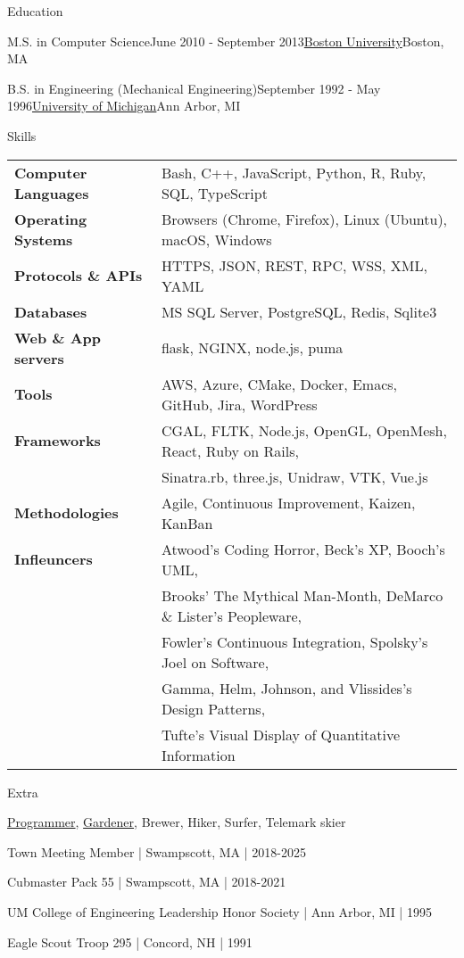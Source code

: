 \documentclass{resume}
\begin{document}
\begin{rSection}{Education}

  \begin{rSubsection}{M.S. in Computer Science}{June 2010 - September 2013}{\href{https://www.bu.edu/}{Boston University}}{Boston, MA}
  \item[]
  \end{rSubsection}

  \begin{rSubsection}{B.S. in Engineering (Mechanical Engineering)}{September 1992 - May 1996}{\href{https://www.umich.edu/}{University of Michigan}}{Ann Arbor, MI}
  \item[]
  \end{rSubsection}

\end{rSection}


\begin{rSection}{Skills}
\begin{tabular}{ @{} >{\bfseries}l @{\hspace{6ex}} l }
Computer Languages & Bash, C++, JavaScript, Python, R, Ruby, SQL, TypeScript \\
Operating Systems & Browsers (Chrome, Firefox), Linux (Ubuntu), macOS, Windows \\
Protocols \& APIs & HTTPS, JSON, REST, RPC, WSS, XML, YAML \\
Databases & MS SQL Server, PostgreSQL, Redis, Sqlite3 \\
Web \& App servers & flask, NGINX, node.js, puma \\
Tools & AWS, Azure, CMake, Docker, Emacs, GitHub, Jira, WordPress \\
Frameworks & CGAL, FLTK, Node.js, OpenGL, OpenMesh, React, Ruby on Rails, \\
 & Sinatra.rb, three.js, Unidraw, VTK, Vue.js \\
Methodologies & Agile, Continuous Improvement, Kaizen, KanBan \\
Infleuncers & Atwood's Coding Horror, Beck's XP, Booch's UML, \\
 & Brooks' The Mythical Man-Month, DeMarco \& Lister's Peopleware, \\
 & Fowler's Continuous Integration, Spolsky's Joel on Software, \\
 & Gamma, Helm, Johnson, and Vlissides's Design Patterns, \\
 & Tufte's Visual Display of Quantitative Information
\end{tabular}
\end{rSection}

\begin{rSection}{Extra}
\item \href{https://github.com/terryg}{Programmer}, \href{https://www.tiktok.com/@growherbert}{Gardener}, Brewer, Hiker, Surfer, Telemark skier
\item Town Meeting Member | Swampscott, MA | 2018-2025
\item Cubmaster Pack 55 | Swampscott, MA | 2018-2021
\item UM College of Engineering Leadership Honor Society | Ann Arbor, MI | 1995
\item Eagle Scout Troop 295 | Concord, NH | 1991
\end{rSection}
\end{document}
